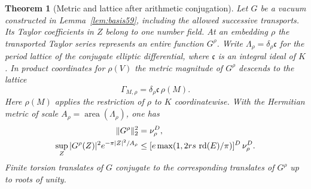 \documentclass[a4paper,11pt]{article}
\newtheorem{theorem}[proposition]{Theorem}
\theoremstyle{definition}
\theoremstyle{remark}
\numberwithin{equation}{section}
\begin{document}
\begin{theorem}[Metric and lattice after arithmetic conjugation]\label{thm:transport59}
Let \(G\) be a vacuum constructed in Lemma~\ref{lem:basis59},
including the allowed successive transports. Its Taylor coefficients
in \(Z\) belong to one number field. At an embedding \(\rho\)
the transported Taylor series represents an entire function
\(G^\rho\). Write \(\Lambda_\rho=\delta_\rho\mathfrak c\) for
the period lattice of the conjugate elliptic differential, where
\(\mathfrak c\) is an integral ideal of \(K\). In product
coordinates for \(\rho(V)\) the metric magnitude of \(G^\rho\)
descends to the lattice
\[
                    \Gamma_{M,\rho}=\delta_\rho\mathfrak c\,\rho(M).
\]
Here \(\rho(M)\) applies the restriction of \(\rho\) to \(K\)
coordinatewise. With the Hermitian metric of scale
\(A_\rho=\operatorname{area}(\Lambda_\rho)\), one has
\begin{align}
      \|G^\rho\|_2^2&=\nu_\rho^D, \notag\\
      \sup_Z |G^\rho(Z)|^2e^{-\pi |Z|^2/A_\rho}
          &\le [e\max(1,2rs\,\operatorname{rd}(E)/\pi)]^D\,\nu_\rho^D .
                                                       \label{eq:vac59}
\end{align}
Finite torsion translates of \(G\) conjugate to the corresponding
translates of \(G^\rho\) up to roots of unity.
\end{theorem}
\end{document}
